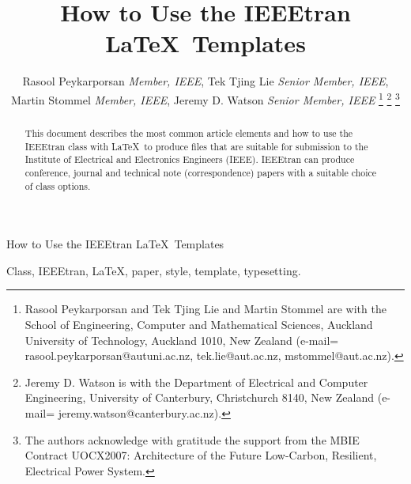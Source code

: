 \documentclass[lettersize,journal]{IEEEtran}
\begin{document}
\title{How to Use the IEEEtran \LaTeX \ Templates}
\author{Rasool Peykarporsan  \textit{Member, IEEE}, Tek Tjing Lie  \textit{Senior Member, IEEE}, Martin Stommel  \textit{Member, IEEE}, Jeremy D. Watson  \textit{Senior Member, IEEE} %
	\thanks{Rasool Peykarporsan and Tek Tjing Lie and Martin Stommel are with the School of Engineering, Computer and Mathematical Sciences, Auckland University of Technology, Auckland 1010, New Zealand (e-mail= rasool.peykarporsan@autuni.ac.nz, tek.lie@aut.ac.nz, mstommel@aut.ac.nz).}
	\thanks{Jeremy D. Watson is with the Department of Electrical and Computer Engineering, University of Canterbury, Christchurch 8140, New Zealand (e-mail= jeremy.watson@canterbury.ac.nz).}
	\thanks{The authors acknowledge with gratitude the support from the MBIE Contract UOCX2007: Architecture of the Future Low-Carbon, Resilient, Electrical Power System.}
	}
	




%
{How to Use the IEEEtran \LaTeX \ Templates}

\maketitle

\begin{abstract}
This document describes the most common article elements and how to use the IEEEtran class with \LaTeX \ to produce files that are suitable for submission to the Institute of Electrical and Electronics Engineers (IEEE).  IEEEtran can produce conference, journal and technical note (correspondence) papers with a suitable choice of class options.
\end{abstract}

\begin{IEEEkeywords}
Class, IEEEtran, \LaTeX, paper, style, template, typesetting.
\end{IEEEkeywords}
\end{document}
